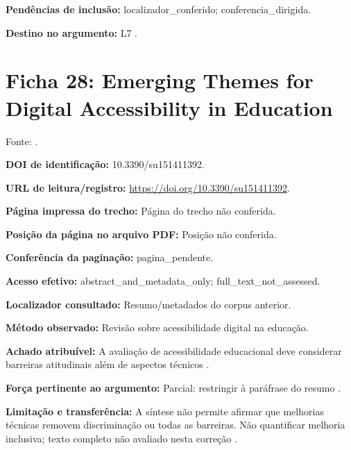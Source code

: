 \noindent\textbf{Pendências de inclusão:} localizador\_conferido; conferencia\_dirigida.\par\medskip

\noindent\textbf{Destino no argumento:} L7 .

\clearpage\section*{Ficha 28: Emerging Themes for Digital Accessibility in Education}

Fonte: \citet{gobbo2023}.

\noindent\textbf{DOI de identificação:} 10.3390/su151411392.\par\medskip

\noindent\textbf{URL de leitura/registro:} \url{https://doi.org/10.3390/su151411392}.\par\medskip

\noindent\textbf{Página impressa do trecho:} Página do trecho não conferida.\par\medskip

\noindent\textbf{Posição da página no arquivo PDF:} Posição não conferida.\par\medskip

\noindent\textbf{Conferência da paginação:} pagina\_pendente.\par\medskip

\noindent\textbf{Acesso efetivo:} abstract\_and\_metadata\_only; full\_text\_not\_assessed.\par\medskip

\noindent\textbf{Localizador consultado:} Resumo/metadados do corpus anterior.\par\medskip

\noindent\textbf{Método observado:} Revisão sobre acessibilidade digital na educação.\par\medskip

\noindent\textbf{Achado atribuível:} A avaliação de acessibilidade educacional deve considerar barreiras atitudinais além de aspectos técnicos \citep{gobbo2023}.\par\medskip

\noindent\textbf{Força pertinente ao argumento:} Parcial: restringir à paráfrase do resumo \citep{gobbo2023}.\par\medskip

\noindent\textbf{Limitação e transferência:} A síntese não permite afirmar que melhorias técnicas removem discriminação ou todas as barreiras. Não quantificar melhoria inclusiva; texto completo não avaliado nesta correção \citep{gobbo2023}.\par\medskip

